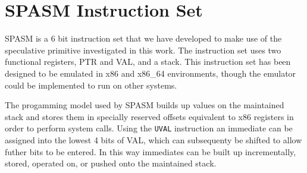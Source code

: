 \section{SPASM Instruction Set}
\label{appendix:spasm}
\renewcommand{\thefootnote}{\fnsymbol{footnote}}

SPASM is a 6 bit instruction set that we have developed to make use of the 
speculative primitive investigated in this work. The instruction set uses two 
functional registers, PTR and VAL, and a stack. This instruction set has been 
designed to be emulated in x86 and x86\_64 environments, though the emulator 
could be implemented to run on other systems. 

The progamming model used by SPASM builds up values on the maintained stack
and stores them in specially reserved offsets equivalent to x86 registers 
in order to perform system calls. Using the \texttt{UVAL} instruction
an immediate can be assigned into the lowest 4 bits of VAL, which 
can subsequenty be shifted to allow futher bits to be entered. In this way
immediates can be built up incrementally, stored, operated on, or pushed 
onto the maintained stack.



